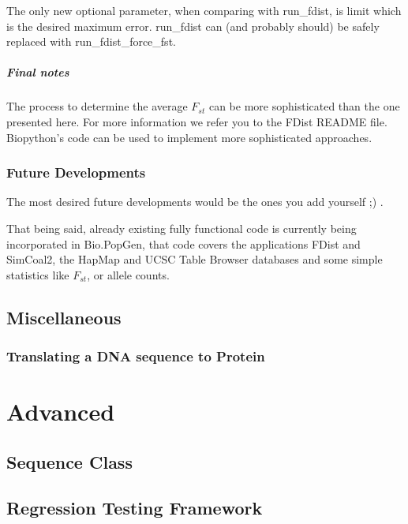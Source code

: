 \documentclass{report}
\begin{document}
The only new optional parameter, when comparing with run\_fdist, is limit
which is the desired maximum error. run\_fdist can (and probably should)
be safely replaced with run\_fdist\_force\_fst.

\paragraph{Final notes}

The process to determine the average $F_{st}$ can be more sophisticated than
the one presented here. For more information we refer you to the FDist
README file. Biopython's code can be used to implement more sophisticated
approaches.

\subsection{Future Developments}

The most desired future developments would be the ones you add yourself ;) .

That being said, already existing fully functional code is currently being
incorporated in Bio.PopGen, that code covers the applications FDist and
SimCoal2, the HapMap and UCSC Table Browser databases and some simple statistics
like $F_{st}$, or allele counts.



\section{Miscellaneous}

\subsection{Translating a DNA sequence to Protein}

\chapter{Advanced}

\section{Sequence Class}

\section{Regression Testing Framework}
\label{sec:regr_test}
\end{document}
